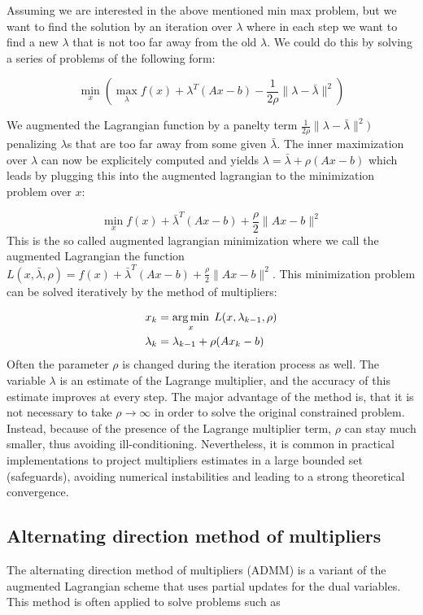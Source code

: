Assuming we are interested in the above mentioned min max problem, but we want to find the solution by an iteration over $\lambda$ where in each step we want to find a new $\lambda$ that is not too far away from the old $\lambda$. We could do this by solving a series of problems of the following form:

\[\min_{x} (\max_{\lambda} f(x)+\lambda^T(Ax-b)-\frac{1}{2\rho}\|\lambda-\bar{\lambda}\|^2)\]


We augmented the Lagrangian function by a panelty term $\frac{1}{2\rho}\|\lambda-\bar{\lambda}\|^2)$ penalizing $\lambda$s that are too far away from some given $\bar{\lambda}$. The inner maximization over $\lambda$ can now be explicitely computed and yields $\lambda=\bar{\lambda}+\rho(Ax-b)$ which leads by plugging this into the augmented lagrangian to the minimization problem over $x$:

\[\min_x f(x)+\bar{\lambda}^T(Ax-b)+\frac{\rho}{2}\|Ax-b\|^2\]
This is the so called augmented lagrangian minimization where we call the augmented Lagrangian the function $L(x,\bar{\lambda},\rho)=f(x)+\bar{\lambda}^T(Ax-b)+\frac{\rho}{2}\|Ax-b\|^2$. This minimization problem can be solved iteratively by the method of multipliers:

\begin{align}
x_k&=\operatorname*{arg\,min}_x \;L(x,\lambda_{k-1},\rho)\\
\lambda_k&=\lambda_{k-1}+\rho(Ax_k-b)
\end{align}
Often the parameter $\rho$ is changed during the iteration process as well.
The variable $\lambda$  is an estimate of the Lagrange multiplier, and the accuracy of this estimate improves at every step. The major advantage of the method is, that it is not necessary to take $\rho\rightarrow \infty$ in order to solve the original constrained problem. Instead, because of the presence of the Lagrange multiplier term, $\rho$  can stay much smaller, thus avoiding ill-conditioning. Nevertheless, it is common in practical implementations to project multipliers estimates in a large bounded set (safeguards), avoiding numerical instabilities and leading to a strong theoretical convergence.

\subsection{Alternating direction method of multipliers}
The alternating direction method of multipliers (ADMM) is a variant of the augmented Lagrangian scheme that uses partial updates for the dual variables. This method is often applied to solve problems such as

